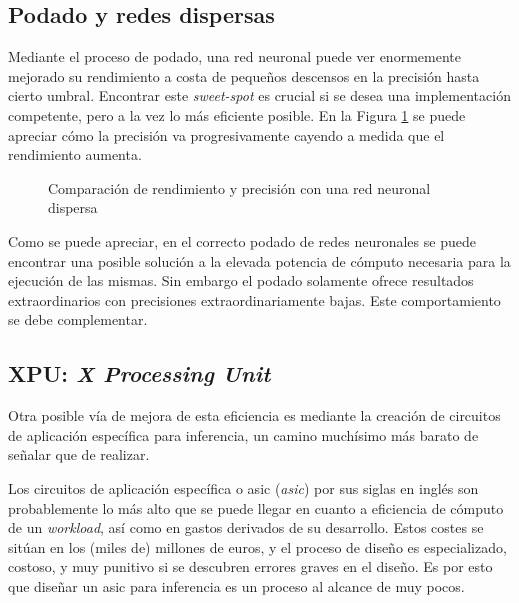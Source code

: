 \subsection{Podado y redes dispersas}
\label{ssec:podado_y_redes_dispersas}
Mediante el proceso de podado, una red neuronal puede ver enormemente mejorado su rendimiento a costa de pequeños descensos en la precisión hasta cierto umbral. Encontrar este \textit{sweet-spot} es crucial si se desea una implementación competente, pero a la vez lo más eficiente posible. En la Figura \ref{fig:grafica_sparse_vs_dense} \cite{neuralmagic_pruning_overview} se puede apreciar cómo la precisión va progresivamente cayendo a medida que el rendimiento aumenta.

\begin{figure}[h!]
    \centering
    \vspace*{0.5cm}
    \def\svgwidth{0.9\textwidth}
    
    \caption{Comparación de rendimiento y precisión con una red neuronal dispersa}
    \label{fig:grafica_sparse_vs_dense}
\end{figure}

Como se puede apreciar, en el correcto podado de redes neuronales se puede encontrar una posible solución a la elevada potencia de cómputo necesaria para la ejecución de las mismas. Sin embargo el podado solamente ofrece resultados extraordinarios con precisiones extraordinariamente bajas. Este comportamiento se debe complementar.

\subsection{XPU: \textit{X Processing Unit}}
\label{ssec:xpu}
Otra posible vía de mejora de esta eficiencia es mediante la creación de circuitos de aplicación específica para inferencia, un camino muchísimo más barato de señalar que de realizar.

Los circuitos de aplicación específica o \acrshort{asic} (\textit{\acrlong{asic}}) por sus siglas en inglés son probablemente lo más alto que se puede llegar en cuanto a eficiencia de cómputo de un \textit{workload}, así como en gastos derivados de su desarrollo. Estos costes se sitúan en los (miles de) millones de euros, y el proceso de diseño es especializado, costoso, y muy punitivo si se descubren errores graves en el diseño. Es por esto que diseñar un \acrshort{asic} para inferencia es un proceso al alcance de muy pocos.


